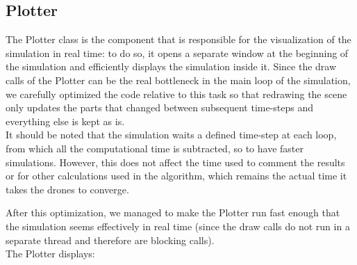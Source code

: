 \subsection{Plotter}
The Plotter class is the component that is responsible for the visualization of the simulation in real time: to do so, it opens a separate window at the beginning of the simulation and efficiently displays the simulation inside it. Since the draw calls of the Plotter can be the real bottleneck in the main loop of the simulation, we carefully optimized the code relative to this task so that redrawing the scene only updates the parts that changed between subsequent time-steps and everything else is kept as is.\\
It should be noted that the simulation waits a defined time-step at each loop, from which all the computational time is subtracted, so to have faster simulations. However, this does not affect the time used to comment the results or for other calculations used in the algorithm, which remains the actual time it takes the drones to converge. 

After this optimization, we managed to make the Plotter run fast enough that the simulation seems effectively in real time (since the draw calls do not run in a separate thread and therefore are blocking calls).\\
The Plotter displays:

